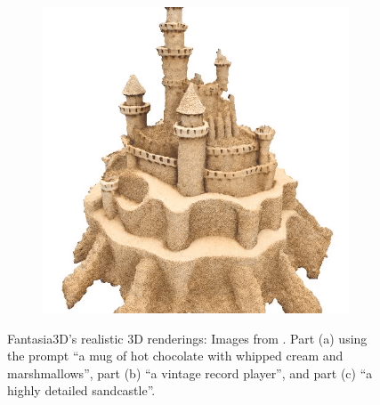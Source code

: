 \begin{figure}[ht]
\begin{subfigure}[b]{0.3\textwidth}
        \caption{}
    \end{subfigure}
    \begin{subfigure}[b]{0.3\textwidth}
        \centering
        \includegraphics[width=\textwidth]{etc/Original/fantasia_ahighly_detailed_sandcastle.PNG}
        \caption{}
    \end{subfigure}
    \caption{Fantasia3D's realistic 3D renderings: Images from \citep{chen2023fantasia3d}. Part (a) using the prompt ``a mug of hot chocolate with whipped cream and marshmallows'', part (b) ``a vintage record player'', and part (c) ``a highly detailed sandcastle''.}\label{fig:fantasia3DOriginal}
\end{figure}

